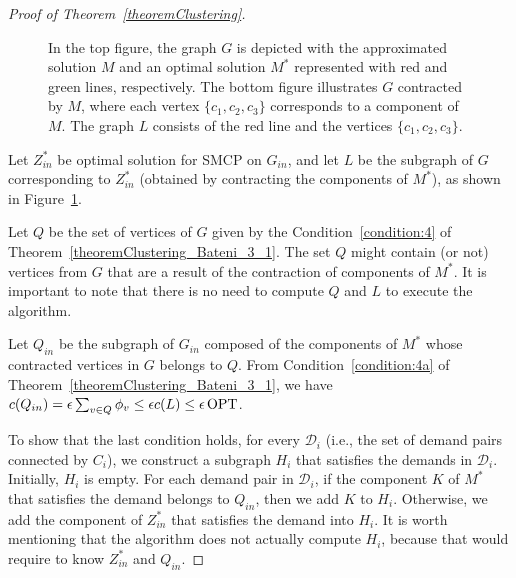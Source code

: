 \begin{proof}[Proof of Theorem~\ref{theoremClustering}]
\begin{figure}[H]

    \caption{In the top figure, the graph \(G\) is depicted with the approximated solution \(M\) and an optimal solution \(M^\ast\) represented with red and green lines, respectively. The bottom figure illustrates \(G\) contracted by \(M\), where each vertex \(\{c_1, c_2, c_3\}\) corresponds to a component of \(M\). The graph \(L\) consists of the red line and the vertices \(\{c_1, c_2, c_3\}\).}
    \label{fig:theorem_clustering_opt_contracted}
\end{figure}


Let \(Z_{in}^\ast\) be optimal solution for SMCP on \(G_{in}\), and let \(L\) be the subgraph of \(G\) corresponding to \(Z_{in}^\ast\) (obtained by contracting the components of \(M^\ast\)), as shown in Figure~\ref{fig:theorem_clustering_opt_contracted}. 

Let \(Q\) be the set of vertices of \(G\) given by the Condition~\eqref{condition:4} of Theorem~\ref{theoremClustering_Bateni_3_1}. The set \(Q\) might contain (or not) vertices from \(G\) that are a result of the contraction of components of \(M^\ast\). It is important to note that there is no need to compute \(Q\) and \(L\) to execute the algorithm. 

Let \(Q_{in}\) be the subgraph of \(G_{in}\) composed of the components of \(M^\ast\) whose contracted vertices in \(G\) belongs to \(Q\). From Condition~\eqref{condition:4a} of Theorem~\ref{theoremClustering_Bateni_3_1}, we have \(c(Q_{in}) = \epsilon \sum_{v \in Q} \phi_v \leq \epsilon c(L) \leq \epsilon \operatorname{\textrm{OPT}}\).

To show that the last condition holds, for every \(\mathcal{D}_i\) (i.e., the set of demand pairs connected by \(C_i\)), we construct a subgraph \(H_i\) that satisfies the demands in \(\mathcal{D}_i\). Initially, \(H_i\) is empty. For each demand pair in \(\mathcal{D}_i\), if the component \(K\) of \(M^\ast\) that satisfies the demand belongs to \(Q_{in}\), then we add \(K\) to \(H_i\). Otherwise, we add the component of \(Z_{in}^\ast\) that satisfies the demand into \(H_i\). It is worth mentioning that the algorithm does not actually compute \(H_i\), because that would require to know \(Z_{in}^\ast\) and \(Q_{in}\).


\end{proof}
